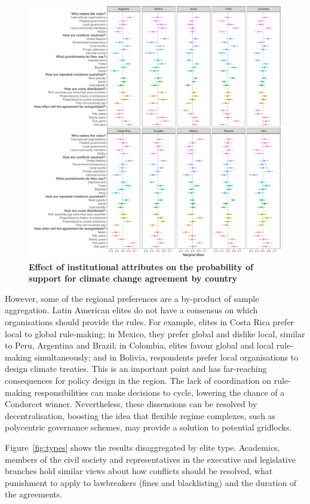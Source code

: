 \documentclass[a4paper,12pt]{article}
\begin{document}
\begin{figure}[H]
	\centering
	\includegraphics[width=\linewidth]{countries.pdf}
	\caption{\textbf{Effect of institutional attributes on the probability of support for climate change agreement by country}}
	\label{fig:countries}
\end{figure}

However, some of the regional preferences are a by-product of sample aggregation. Latin American elites do not have a consensus on which organisations should provide the rules. For example, elites in Costa Rica prefer local to global rule-making; in Mexico, they prefer global and dislike local, similar to Peru, Argentina and Brazil; in Colombia, elites favour global and local rule-making simultaneously; and in Bolivia, respondents prefer local organisations to design climate treaties. This is an important point and has far-reaching consequences for policy design in the region. The lack of coordination on rule-making responsibilities can make decisions to cycle, lowering the chance of a Condorcet winner. Nevertheless, these dissensions can be resolved by decentralisation, boosting the idea that flexible regime complexes, such as polycentric governance schemes, may provide a solution to potential gridlocks.

Figure~\ref{fig:types} shows the results disaggregated by elite type. Academics, members of the civil society and representatives in the executive and legislative branches hold similar views about how conflicts should be resolved, what punishment to apply to lawbreakers (fines and blacklisting) and the duration of the agreements.  
\end{document}
